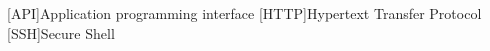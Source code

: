 
\begin{acronym}[BPMN]
[API]{Application programming interface}
[HTTP]{Hypertext Transfer Protocol}
[SSH]{Secure Shell}
\end{acronym}
